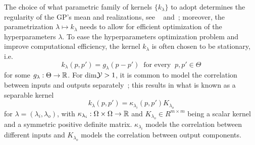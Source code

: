The choice of what parametric family of kernels $\{ k_\lambda\}$ to adopt determines the regularity of the GP's mean and realizations, see ~\cite{Kanagawa2018} and~\cite[chap. 4]{ChristmannSteinwart2008}; moreover, the parametrization $\lambda \mapsto k_\lambda$ needs to allow for efficient optimization of the hyperparameters $\lambda$. \newline
To ease the hyperparameters optimization problem and improve computational efficiency, the kernel $k_\lambda$ is often chosen to be stationary, i.e. 
\[
k_\lambda(p, p') = g_\lambda(p - p') \ \text{ for every } \ p, p' \in \Theta
\]
for some $g_\lambda:\Theta \rightarrow \mathbb{R}$.
For dim$\mathcal Y > 1$, it is common to model the correlation between inputs and outputs separately~\cite{AlvarezRosascoLawrence2012}; this results in what is known as a separable kernel \[
    k_\lambda(p, p') = \kappa_{\lambda_i}(p, p') K_{\lambda_o}
\] for $\lambda = (\lambda_i, \lambda_o)$, with $\kappa_{\lambda_i}: \Omega \times \Omega \rightarrow \mathbb{R}$ and $K_{\lambda_o} \in R^{m\times m}$ being a scalar kernel and a symmetric positive definite matrix.
$\kappa_{\lambda_i}$ models the correlation between different inputs and $K_{\lambda_o}$ models the correlation between output components.

